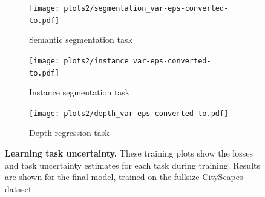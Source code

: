 \begin{figure}[p]
\begin{center}
\begin{subfigure}[t]{0.32\linewidth}
\begin{center}
  \texttt{[image: plots2/segmentation\_var-eps-converted-to.pdf]}
  \caption{Semantic segmentation task}
\end{center}
\end{subfigure}
\begin{subfigure}[t]{0.32\linewidth}
\begin{center}
  \texttt{[image: plots2/instance\_var-eps-converted-to.pdf]}
  \caption{Instance segmentation task}
\end{center}
\end{subfigure}
\begin{subfigure}[t]{0.32\linewidth}
\begin{center}
  \texttt{[image: plots2/depth\_var-eps-converted-to.pdf]}
  \caption{Depth regression task}
\end{center}
\end{subfigure}
\end{center}
   \caption[Learning task uncertainty.]{\textbf{Learning task uncertainty.} These training plots show the losses and task uncertainty estimates for each task during training. Results are shown for the final model, trained on the fullsize CityScapes dataset.}
\label{fig:taskunc}
\end{figure}


